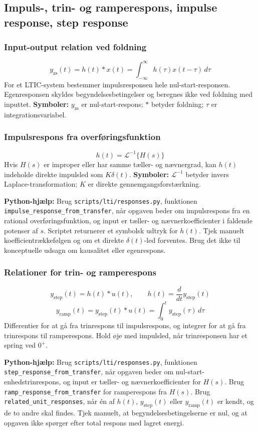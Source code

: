 \subsection{Impuls-, trin- og ramperespons, impulse response, step response}

\subsubsection{Input-output relation ved foldning}
\[
y_{\mathrm{zs}}(t)=h(t)*x(t)=\int_{-\infty}^{\infty}h(\tau)x(t-\tau)\,d\tau
\]
For et LTIC-system bestemmer impulsresponsen hele nul-start-responsen. Egenresponsen skyldes begyndelsesbetingelser og beregnes ikke ved foldning med inputtet.
\textbf{Symboler:} \(y_{\mathrm{zs}}\) er nul-start-respons; \(*\) betyder foldning; \(\tau\) er integrationsvariabel.

\subsubsection{Impulsrespons fra overføringsfunktion}
\[
h(t)=\mathcal{L}^{-1}\{H(s)\}
\]
Hvis \(H(s)\) er improper eller har samme tæller- og nævnergrad, kan \(h(t)\) indeholde direkte impulsled som \(K\delta(t)\).
\textbf{Symboler:} \(\mathcal{L}^{-1}\) betyder invers Laplace-transformation; \(K\) er direkte gennemgangsforstærkning.

\textbf{Python-hjælp:} Brug \texttt{scripts/lti/responses.py}, funktionen \texttt{impulse\_response\_from\_transfer}, når opgaven beder om impulsrespons fra en rational overføringsfunktion, og input er tæller- og nævnerkoefficienter i faldende potenser af \(s\). Scriptet returnerer et symbolsk udtryk for \(h(t)\). Tjek manuelt koefficientrækkefølgen og om et direkte \(\delta(t)\)-led forventes. Brug det ikke til konceptuelle udsagn om kausalitet eller egenrespons.

\subsubsection{Relationer for trin- og ramperespons}
\[
y_{\mathrm{step}}(t)=h(t)*u(t),\qquad
h(t)=\frac{d}{dt}y_{\mathrm{step}}(t)
\]
\[
y_{\mathrm{ramp}}(t)=y_{\mathrm{step}}(t)*u(t)=\int_0^t y_{\mathrm{step}}(\tau)\,d\tau
\]
Differentier for at gå fra trinrespons til impulsrespons, og integrer for at gå fra trinrespons til ramperespons. Hold øje med impulsled, når trinresponsen har et spring ved \(0^+\).

\textbf{Python-hjælp:} Brug \texttt{scripts/lti/responses.py}, funktionen \texttt{step\_response\_from\_transfer}, når opgaven beder om nul-start-enhedstrinrespons, og input er tæller- og nævnerkoefficienter for \(H(s)\). Brug \texttt{ramp\_response\_from\_transfer} for ramperespons fra \(H(s)\). Brug \texttt{related\_unit\_responses}, når én af \(h(t)\), \(y_{\mathrm{step}}(t)\) eller \(y_{\mathrm{ramp}}(t)\) er kendt, og de to andre skal findes. Tjek manuelt, at begyndelsesbetingelserne er nul, og at opgaven ikke spørger efter total respons med lagret energi.


